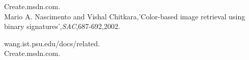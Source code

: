 \begin{thebibliography}{100}



Create.msdn.com.\\

Mario A. Nascimento and Vishal Chitkara,'Color-based image retrieval using binary signatures',\emph{SAC},687-692,2002.

wang.ist.psu.edu/docs/related.\\

Create.msdn.com.\\

\end{thebibliography}  
